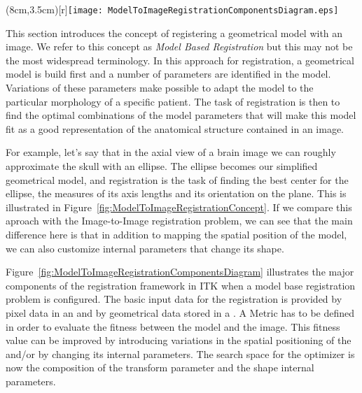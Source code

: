 %
%
%
%
%
%

\parpic(8cm,3.5cm)[r]{\texttt{[image: ModelToImageRegistrationComponentsDiagram.eps]}}

This section introduces the concept of registering a geometrical model with an
image. We refer to this concept as \emph{Model Based Registration} but this may
not be the most widespread terminology. In this approach for registration, a
geometrical model is build first and a number of parameters are identified in
the model. Variations of these parameters make possible to adapt the model to
the particular morphology of a specific patient. The task of registration is
then to find the optimal combinations of the model parameters that will make
this model fit as a good representation of the anatomical structure contained
in an image. 


For example, let's say that in the axial view of a brain image we can roughly
approximate the skull with an ellipse. The ellipse becomes our simplified
geometrical model, and registration is the task of finding the best center for
the ellipse, the measures of its axis lengths and its orientation on the plane.
This is illustrated in Figure~\ref{fig:ModelToImageRegistrationConcept}.  If we
compare this aproach with the Image-to-Image registration problem, we can see
that the main difference here is that in addition to mapping the spatial
position of the model, we can also customize internal parameters that change
its shape.

Figure~\ref{fig:ModelToImageRegistrationComponentsDiagram} illustrates the
major components of the registration framework in ITK when a model base
registration problem is configured. The basic input data for the registration
is provided by pixel data in an  and by geometrical data stored
in a . A Metric has to be defined in order to evaluate
the fitness between the model and the image. This fitness value can be improved
by introducing variations in the spatial positioning of the
 and/or by changing its internal parameters. The search
space for the optimizer is now the composition of the transform parameter and
the shape internal parameters.

